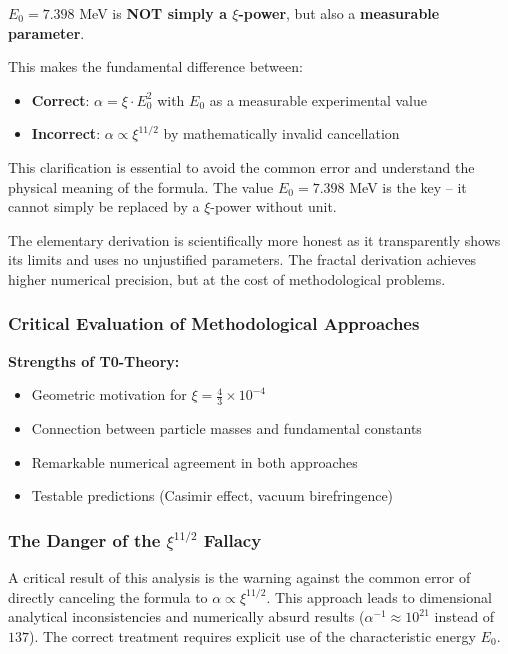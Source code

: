 \documentclass[12pt,a4paper]{article}
\theoremstyle{definition}
\begin{document}
	$E_0 = 7.398$ MeV is \textbf{NOT simply a $\xi$-power}, but also a \textbf{measurable parameter}.
	
	This makes the fundamental difference between:
	\begin{itemize}
		\item \textbf{Correct}: $\alpha = \xi \cdot E_0^2$ with $E_0$ as a measurable experimental value
		\item \textbf{Incorrect}: $\alpha \propto \xi^{11/2}$ by mathematically invalid cancellation
	\end{itemize}
	
	This clarification is essential to avoid the common error and understand the physical meaning of the formula. The value $E_0 = 7.398$ MeV is the key -- it cannot simply be replaced by a $\xi$-power without unit.
	
	The elementary derivation is scientifically more honest as it transparently shows its limits and uses no unjustified parameters. The fractal derivation achieves higher numerical precision, but at the cost of methodological problems.
	
	\subsubsection{Critical Evaluation of Methodological Approaches}
	
	\textbf{Strengths of T0-Theory:}
	\begin{itemize}
		\item Geometric motivation for $\xi = \frac{4}{3} \times 10^{-4}$
		\item Connection between particle masses and fundamental constants
		\item Remarkable numerical agreement in both approaches
		\item Testable predictions (Casimir effect, vacuum birefringence)
	\end{itemize}
	
	\subsubsection{The Danger of the $\xi^{11/2}$ Fallacy}
	
	A critical result of this analysis is the warning against the common error of directly canceling the formula to $\alpha \propto \xi^{11/2}$. This approach leads to dimensional analytical inconsistencies and numerically absurd results ($\alpha^{-1} \approx 10^{21}$ instead of $137$). The correct treatment requires explicit use of the characteristic energy $E_0$.
	
\end{document}
